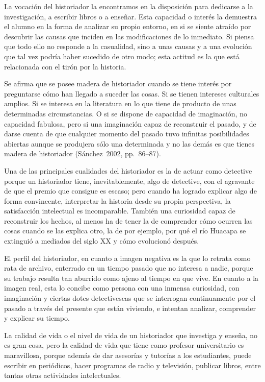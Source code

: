  
La vocación del historiador la encontramos en la disposición para 
dedicarse a la investigación, a escribir libros o a enseñar. Esta 
capacidad o interés la demuestra el alumno en la forma de analizar su 
propio entorno, en si se siente atraído por descubrir las causas que 
inciden en las modificaciones de lo inmediato. Si piensa que todo ello 
no responde a la casualidad, sino a unas causas y a una evolución que 
tal vez podría haber sucedido de otro modo; esta actitud es la que está 
relacionada con el tirón por la historia.

Se afirma que se posee madera de historiador cuando se tiene interés 
por preguntarse cómo han llegado a suceder las cosas. Si se tienen 
intereses culturales amplios. Si se interesa en la literatura en lo que 
tiene de producto de unas determinadas circunstancias. O si se dispone 
de capacidad de imaginación, no capacidad fabulosa, pero si una 
imaginación capaz de reconstruir el pasado, y de darse cuenta de que 
cualquier momento del pasado tuvo infinitas  posibilidades abiertas 
aunque se produjera sólo una determinada y no las demás es que tienes 
madera de historiador (Sánchez~2002, pp.~86--87).

 
Una de las principales cualidades del historiador es la de actuar como 
detective porque un historiador tiene, inevitablemente, algo de 
detective, con el agravante de que el premio que consigue es escaso; 
pero cuando ha logrado explicar algo de forma convincente, interpretar 
la historia desde su propia perspectiva, la satisfacción intelectual es 
incomparable. También una curiosidad capaz de reconstruir los hechos, 
al menos ha de tener la de comprender cómo ocurren las cosas cuando se 
las explica otro, la de por ejemplo, por qué el río Huacapa se 
extinguió a mediados del siglo XX y cómo evolucionó después.

 
El perfil del historiador, en cuanto a imagen negativa es la que lo 
retrata como rata de archivo, enterrado en un tiempo pasado que no 
interesa a nadie, porque su trabajo resulta tan aburrido como ajeno al 
tiempo en que vive. En cuanto a la imagen real, esta lo concibe como 
persona con una inmensa curiosidad, con imaginación y ciertas dotes 
detectivescas que se interrogan continuamente por el pasado a través 
del presente que están viviendo, e intentan analizar, comprender y 
explicar su tiempo.

 
La calidad de vida o el nivel de vida de un historiador que investiga y 
enseña, no es gran cosa, pero la calidad de vida que tiene como 
profesor universitario es maravillosa, porque además de dar asesorías y 
tutorías a los estudiantes, puede escribir en periódicos, hacer 
programas de radio y televisión, publicar libros, entre tantas otras 
actividades intelectuales.

